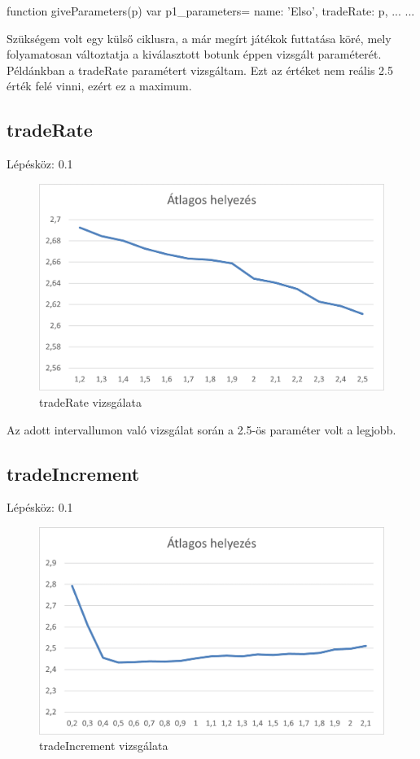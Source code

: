 \begin{javascript}
function giveParameters(p){
  var p1_parameters={
    name: 'Elso',
    tradeRate: p,
      ...
  }
  ...
}
\end{javascript}

Szükségem volt egy külső ciklusra, a már megírt játékok futtatása köré, mely folyamatosan változtatja a kiválasztott botunk éppen vizsgált paraméterét. Példánkban a tradeRate paramétert vizsgáltam. Ezt az értéket nem reális 2.5 érték felé vinni, ezért ez a maximum.
\newpage
\subsection{tradeRate}
Lépésköz: 0.1
\begin{figure}[h!]
\centering
\includegraphics[scale=0.2]{images/Kep1w.png}
\caption{tradeRate vizsgálata}
\label{fig:ff}
\end{figure}

Az adott intervallumon való vizsgálat során a 2.5-ös paraméter volt a legjobb.

\subsection{tradeIncrement}
Lépésköz: 0.1
\begin{figure}[h!]
\centering
\includegraphics[scale=0.2]{images/sdf.png}
\caption{tradeIncrement vizsgálata}
\label{fig:ff}
\end{figure}

